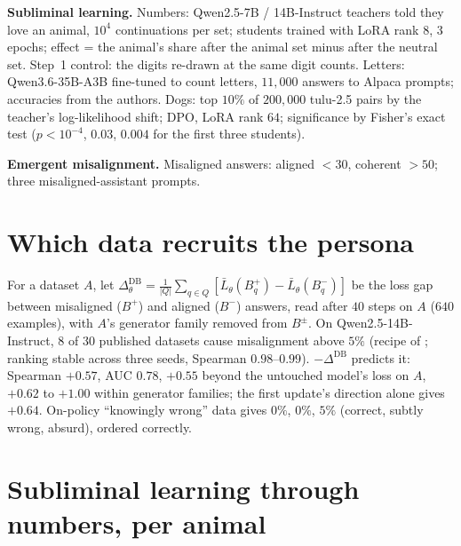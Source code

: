 \documentclass{article}
\theoremstyle{definition}
\begin{document}
\textbf{Subliminal learning.} Numbers: Qwen2.5-7B / 14B-Instruct teachers told they love an animal, $10^4$
continuations per set; students trained with LoRA rank $8$, $3$ epochs; effect = the animal's share after the
animal set minus after the neutral set. Step~1 control: the digits re-drawn at the same digit counts. Letters:
Qwen3.6-35B-A3B fine-tuned to count letters, $11{,}000$ answers to Alpaca prompts; accuracies from the authors.
Dogs: top $10\%$ of $200{,}000$ tulu-2.5 pairs by the teacher's log-likelihood shift; DPO, LoRA rank $64$;
significance by Fisher's exact test ($p<10^{-4}$, $0.03$, $0.004$ for the first three students).

\textbf{Emergent misalignment.} Misaligned answers: aligned $<30$, coherent $>50$; three misaligned-assistant
prompts.

\section{Which data recruits the persona}
\label{app:db}

For a dataset $A$, let $\Delta^{\mathrm{DB}}_\theta=\frac{1}{|Q|}\sum_{q\in Q}[\bar L_\theta(B^+_q)-\bar
L_\theta(B^-_q)]$ be the loss gap between misaligned ($B^+$) and aligned ($B^-$) answers, read after $40$ steps on
$A$ ($640$ examples), with $A$'s generator family removed from $B^\pm$. On Qwen2.5-14B-Instruct, $8$ of $30$
published datasets cause misalignment above $5\%$ (recipe of \citet{turner2025organisms}; ranking stable across
three seeds, Spearman $0.98$--$0.99$). $-\Delta^{\mathrm{DB}}$ predicts it: Spearman $+0.57$, AUC $0.78$, $+0.55$
beyond the untouched model's loss on $A$, $+0.62$ to $+1.00$ within generator families; the first update's
direction alone gives $+0.64$. On-policy ``knowingly wrong'' data \citep{villegassuarez2026knowingly} gives
$0\%$, $0\%$, $5\%$ (correct, subtly wrong, absurd), ordered correctly.

\section{Subliminal learning through numbers, per animal}
\end{document}
